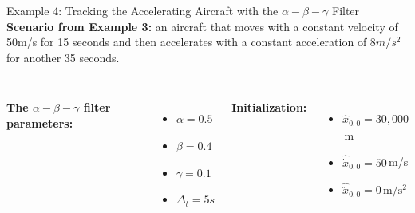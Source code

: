 \begin{frame}{Example 4: Tracking the Accelerating Aircraft with the $\alpha-\beta-\gamma$ Filter}
    \textbf{Scenario from Example 3:} an aircraft that moves with a constant velocity of 50m/s for 15 seconds and then accelerates with a constant acceleration of $8m/s^2$ for another 35 seconds.
    
\noindent\rule{5cm}{0.4pt}

\begin{columns}    
    
    \vspace{4pt}
    \textbf{The $\alpha-\beta-\gamma$ filter parameters:}
    \begin{itemize}
        \item $\alpha=0.5$
        \item $\beta=0.4$
        \item $\gamma=0.1$
        \item $\Delta_t = 5s$
    \end{itemize}
    \textbf{Initialization:}
    \begin{itemize}
        \item $\hat{x}_{0,0} = 30,000$\,m
        \item $\hat{\dot{x}}_{0,0} = 50$\,m/s
        \item $\hat{\ddot{x}}_{0,0} = 0$\,m/$\text{s}^2$
    \end{itemize}    
\end{columns}    
\end{frame}

